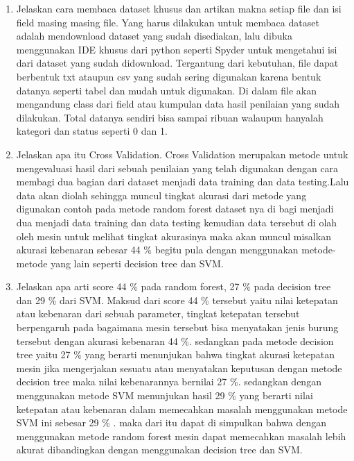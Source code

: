 \begin{enumerate}
\item Jelaskan cara membaca dataset khusus dan artikan makna setiap file dan isi field masing masing file.
Yang harus dilakukan untuk membaca dataset adalah mendownload dataset yang sudah disediakan, lalu dibuka menggunakan IDE khusus dari python seperti Spyder untuk mengetahui isi dari dataset yang sudah didownload. Tergantung dari kebutuhan, file dapat berbentuk txt ataupun csv yang sudah sering digunakan karena bentuk datanya seperti tabel dan mudah untuk digunakan. Di dalam file akan mengandung class dari field atau kumpulan data hasil penilaian yang sudah dilakukan. Total datanya sendiri bisa sampai ribuan walaupun hanyalah kategori dan status seperti 0 dan 1.


\item Jelaskan apa itu Cross Validation.
Cross Validation merupakan metode untuk mengevaluasi hasil dari sebuah penilaian yang telah digunakan dengan cara membagi dua bagian dari dataset menjadi data training dan data testing.Lalu data akan diolah sehingga muncul tingkat akurasi dari metode yang digunakan contoh pada metode random forest dataset nya di bagi menjadi dua menjadi data training dan data testing kemudian data tersebut di olah oleh mesin untuk melihat tingkat akurasinya maka akan muncul misalkan akurasi kebenaran sebesar 44 \% begitu pula dengan menggunakan metode-metode yang lain seperti decision tree dan SVM.


\item Jelaskan apa arti score 44 \% pada random forest, 27 \% pada decision tree dan 29 \% dari SVM.
Maksud dari score 44 \% tersebut yaitu nilai ketepatan atau kebenaran dari sebuah parameter, tingkat ketepatan tersebut berpengaruh pada bagaimana mesin tersebut bisa menyatakan jenis burung tersebut dengan akurasi kebenaran 44 \%. sedangkan pada metode decision tree yaitu 27 \% yang berarti menunjukan bahwa tingkat akurasi ketepatan mesin jika mengerjakan sesuatu atau menyatakan keputusan dengan metode decision tree maka nilai kebenarannya bernilai 27 \%. sedangkan dengan menggunakan metode SVM menunjukan hasil 29 \% yang berarti nilai ketepatan atau kebenaran dalam memecahkan masalah menggunakan metode SVM ini sebesar 29 \% . maka dari itu dapat di simpulkan bahwa dengan menggunakan metode random forest mesin dapat memecahkan masalah lebih akurat dibandingkan dengan menggunakan decision tree dan SVM.



\end{enumerate}
